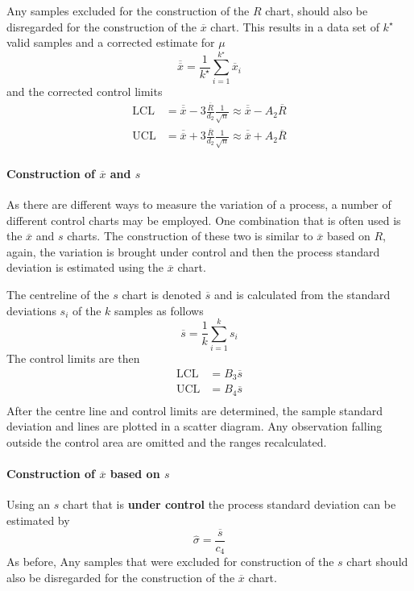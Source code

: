 \documentclass[11pt]{article}
\theoremstyle{definition}
\newcommand*\samplemean[1]{\overline{#1}}
\begin{document}
Any samples excluded for the construction of the $R$ chart, should also be disregarded for the construction of the $\samplemean{x}$ chart. This results in a data set of $k^\star$ valid samples and a corrected estimate for $\mu$
\begin{equation*}
	\samplemean{\samplemean{x}} = \frac{1}{k^\star}\sum_{i=1}^{k^\star}\samplemean{x}_i
\end{equation*}
and the corrected control limits
\begin{align*}
	\text{LCL} &= \samplemean{\samplemean{x}} - 3 \frac{\samplemean{R}}{d_2}\frac{1}{\sqrt{n}} \approx \samplemean{\samplemean{x}} - A_2\samplemean{R} \\
	\text{UCL} &= \samplemean{\samplemean{x}} + 3 \frac{\samplemean{R}}{d_2}\frac{1}{\sqrt{n}} \approx \samplemean{\samplemean{x}} + A_2\samplemean{R}
\end{align*}

\paragraph{Construction of $\samplemean{x}$ and $s$} As there are different ways to measure the variation of a process, a number of different control charts may be employed. One combination that is often used is the $\samplemean{x}$ and $s$ charts. The construction of these two is similar to $\samplemean{x}$ based on $R$, again, the variation is brought under control and then the process standard deviation is estimated using the $\samplemean{x}$ chart.

The centreline of the $s$ chart is denoted $\samplemean{s}$ and is calculated from the standard deviations $s_i$ of the $k$ samples as follows
\begin{equation*}
	\samplemean{s} = \frac{1}{k}\sum_{i=1}^{k} s_i
\end{equation*}
The control limits are then
\begin{align*}
	\text{LCL} &= B_3\samplemean{s}\\
	\text{UCL} &= B_4\samplemean{s}\\
\end{align*}
After the centre line and control limits are determined, the sample standard deviation and lines are plotted in a scatter diagram. Any observation falling outside the control area are omitted and the ranges recalculated.

\paragraph{Construction of $\samplemean{x}$ based on $s$} Using an $s$ chart that is \textbf{under control} the process standard deviation can be estimated by
\begin{equation*}
	\hat{\sigma} = \frac{\samplemean{s}}{c_4}
\end{equation*}
As before, Any samples that were excluded for construction of the $s$ chart should also be disregarded for the construction of the $\samplemean{x}$ chart.
\end{document}
